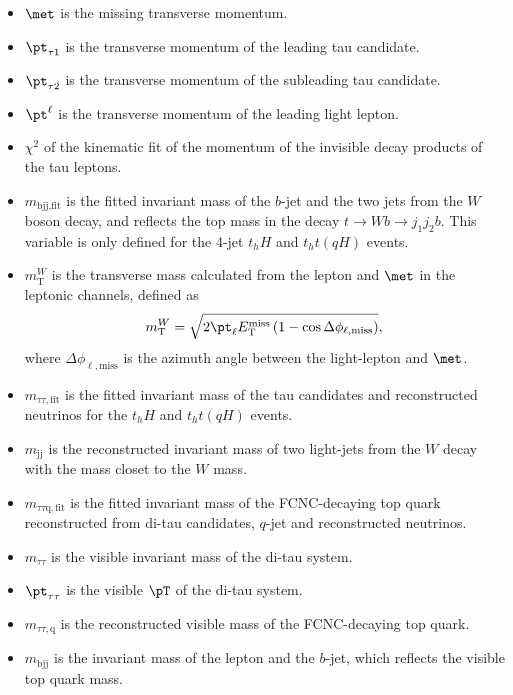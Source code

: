 \documentclass[PAPER, coverpage, atlasdraft=true, texlive=2016, UKenglish]{\ATLASLATEXPATH atlasdoc} %
\begin{document}
\begin{itemize}
\item $\met$ is the missing transverse momentum.
\item ${\pt}_{\tau1} $ is the transverse momentum of the leading tau candidate.
\item ${\pt}_{\tau2}$ is the transverse momentum of the subleading tau candidate.
\item ${\pt}^{\ell}$ is the transverse momentum of the leading light lepton.
\item $\chi^2$ of the kinematic fit of the momentum of the invisible decay products of the tau leptons.
\item $m_{\text{bjj},\text{fit}}$ is the fitted invariant mass of the $b$-jet and the two jets from the $W$ boson decay, and reflects the top mass in the decay $t\to Wb \to j_1j_2b$. This variable is only defined for the 4-jet $t_hH$ and $t_ht(qH)$ events.
\item $m^{W}_{\text{T}}$ is the transverse mass calculated from the lepton and $\met$ in the leptonic channels, defined as
\begin{equation}
m^{W}_{\text{T}} = \sqrt{2 {\pt}_{\ell} E_{\text{T}}^{\text{miss}} \left(1-\cos\Delta\phi_{\ell,\text{miss}} \right)},  
\end{equation}
where $\Delta\phi_{\ell,\text{miss}}$ is the azimuth angle between the light-lepton and $\met$.  
\item $m_{\tau\tau,\text{fit}}$ is the fitted invariant mass of the tau candidates and reconstructed neutrinos for the $t_hH$ and $t_ht(qH)$ events. 
\item $m_{\text{jj}}$ is the reconstructed invariant mass of two light-jets from the $W$ decay with the mass closet to the $W$ mass.
\item $m_{\tau\tau\text{q},\text{fit}}$ is the fitted invariant mass of the FCNC-decaying top quark reconstructed from di-tau candidates, $q$-jet and reconstructed neutrinos.
\item $m_{\tau\tau}$ is the visible invariant mass of the di-tau system. %
\item ${\pt}_{\tau\tau}$ is the visible $\pT$ of the di-tau system.
\item $m_{\tau\tau,\text{q}}$ is the reconstructed visible mass of the FCNC-decaying top quark.
\item $m_{\text{bjj}}$ is the invariant mass of the lepton and the $b$-jet, which reflects the visible top quark mass.

\end{itemize}
\end{document}
